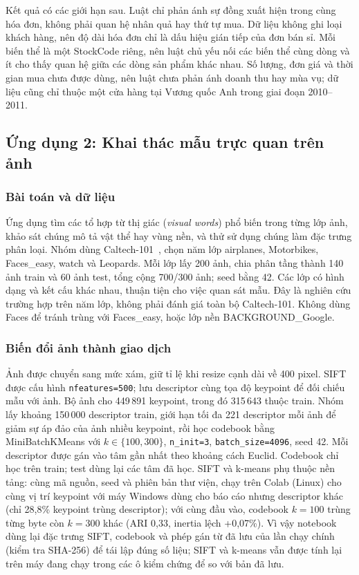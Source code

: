 Kết quả có các giới hạn sau. Luật chỉ phản ánh sự đồng xuất hiện trong cùng hóa đơn, không phải quan hệ nhân quả hay
thứ tự mua. Dữ liệu không ghi loại khách hàng, nên độ dài hóa đơn chỉ là dấu hiệu gián tiếp của đơn bán sỉ. Mỗi biến thể
là một StockCode riêng, nên luật chủ yếu nối các biến thể cùng dòng và ít cho thấy quan hệ giữa các dòng sản phẩm khác
nhau. Số lượng, đơn giá và thời gian mua chưa được dùng, nên luật chưa phản ánh doanh thu hay mùa vụ; dữ liệu cũng chỉ
thuộc một cửa hàng tại Vương quốc Anh trong giai đoạn 2010--2011.

\subsection{Ứng dụng 2: Khai thác mẫu trực quan trên ảnh}
\label{sec:app2}

\subsubsection{Bài toán và dữ liệu}
Ứng dụng tìm các tổ hợp từ thị giác (\textit{visual words}) phổ biến trong từng lớp ảnh, khảo sát chúng mô tả
vật thể hay vùng nền, và thử sử dụng chúng làm đặc trưng phân loại. Nhóm dùng Caltech-101~\cite{caltech101},
chọn năm lớp airplanes, Motorbikes, Faces\_easy, watch và Leopards. Mỗi lớp lấy 200 ảnh, chia phân tầng thành
140 ảnh train và 60 ảnh test, tổng cộng 700/300 ảnh; seed bằng 42. Các lớp có hình dạng và kết cấu khác nhau,
thuận tiện cho việc quan sát mẫu. Đây là nghiên cứu trường hợp trên năm lớp, không phải đánh giá toàn bộ
Caltech-101. Không dùng Faces để tránh trùng với Faces\_easy, hoặc lớp nền BACKGROUND\_Google.

\subsubsection{Biến đổi ảnh thành giao dịch}
Ảnh được chuyển sang mức xám, giữ tỉ lệ khi resize cạnh dài về 400 pixel. SIFT~\cite{lowe2004} được cấu hình
\texttt{nfeatures=500}; lưu descriptor cùng tọa độ keypoint để đối chiếu mẫu với ảnh. Bộ ảnh cho 449\,891 keypoint,
trong đó 315\,643 thuộc train. Nhóm lấy khoảng 150\,000 descriptor train, giới hạn tối đa 221 descriptor mỗi ảnh
để giảm sự áp đảo của ảnh nhiều keypoint, rồi học codebook bằng MiniBatchKMeans với $k\in\{100,300\}$,
\texttt{n\_init=3}, \texttt{batch\_size=4096}, seed 42. Mỗi descriptor được gán vào tâm gần nhất theo khoảng
cách Euclid. Codebook chỉ học trên train; test dùng lại các tâm đã học.
SIFT và k-means phụ thuộc nền tảng: cùng mã nguồn, seed và phiên bản thư viện, chạy trên Colab (Linux) cho cùng
vị trí keypoint với máy Windows dùng cho báo cáo nhưng descriptor khác (chỉ 28,8\% keypoint trùng descriptor); với
cùng đầu vào, codebook $k=100$ trùng từng byte còn $k=300$ khác (ARI 0,33, inertia lệch +0,07\%). Vì vậy notebook dùng lại đặc trưng SIFT, codebook
và phép gán từ đã lưu của lần chạy chính (kiểm tra SHA-256) để tái lập đúng số liệu; SIFT và k-means vẫn được tính
lại trên máy đang chạy trong các ô kiểm chứng để so với bản đã lưu.

